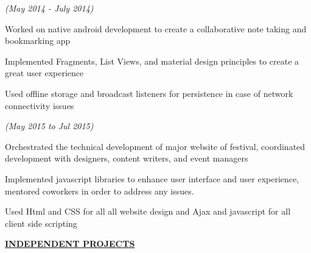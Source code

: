 \documentclass[a4paper]{deedy-resume} %
\begin{document}
\hfill {\textit{\small(May 2014 - July 2014)}}\


\begin{tightitemize}
\item Worked on native android development to create a collaborative note taking and bookmarking app 
\item Implemented Fragments, List Views, and material design principles to create a great user experience
\item Used offline storage and broadcast listeners for persistence in case of network connectivity issues
\end{tightitemize}
\microspace





\hfill {\textit{\small(May 2015 to Jul 2015)}}\\
\begin{tightitemize}
\item Orchestrated the technical development of major website of festival, coordinated development with designers, content writers, and event managers
\item Implemented javascript libraries to enhance user interface and user experience, mentored coworkers in order to address any issues.
\item Used Html and CSS for all all website design and Ajax and javascript for all client side scripting
\end{tightitemize}



\sectionspace

{\uppercase\uline{\textbf{\large{INDEPENDENT PROJECTS}}\hfill}}
\microspace
\end{document}
